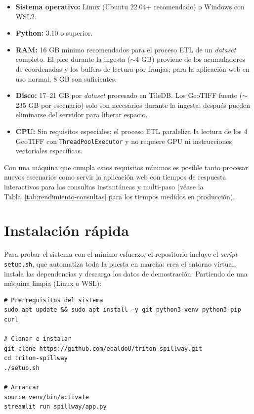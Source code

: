 \begin{itemize}
\item \textbf{Sistema operativo:} Linux (Ubuntu 22.04+ recomendado) o Windows con WSL2.
\item \textbf{Python:} 3.10 o superior.
\item \textbf{RAM:} 16 GB mínimo recomendados para el proceso ETL de un \textit{dataset} completo. El pico durante la ingesta ($\sim$4 GB) proviene de los acumuladores de coordenadas y los buffers de lectura por franjas; para la aplicación web en uso normal, 8 GB son suficientes.
\item \textbf{Disco:} 17--21 GB por \textit{dataset} procesado en TileDB. Los GeoTIFF fuente ($\sim$235 GB por escenario) solo son necesarios durante la ingesta; después pueden eliminarse del servidor para liberar espacio.
\item \textbf{CPU:} Sin requisitos especiales; el proceso ETL paraleliza la lectura de los 4 GeoTIFF con \texttt{ThreadPoolExecutor} y no requiere GPU ni instrucciones vectoriales específicas.
\end{itemize}

Con una máquina que cumpla estos requisitos mínimos es posible tanto procesar nuevos escenarios como servir la aplicación web con tiempos de respuesta interactivos para las consultas instantáneas y multi-paso (véase la Tabla~\ref{tab:rendimiento-consultas} para los tiempos medidos en producción).

\section{Instalación rápida}\label{e.25-instalacion-rapida}

Para probar el sistema con el mínimo esfuerzo, el repositorio incluye el \textit{script} \texttt{setup.sh}, que automatiza toda la puesta en marcha: crea el entorno virtual, instala las dependencias y descarga los datos de demostración. Partiendo de una máquina limpia (Linux o WSL):

\begin{verbatim}
# Prerrequisitos del sistema
sudo apt update && sudo apt install -y git python3-venv python3-pip curl

# Clonar e instalar
git clone https://github.com/ebaldoU/triton-spillway.git
cd triton-spillway
./setup.sh

# Arrancar
source venv/bin/activate
streamlit run spillway/app.py
\end{verbatim}

